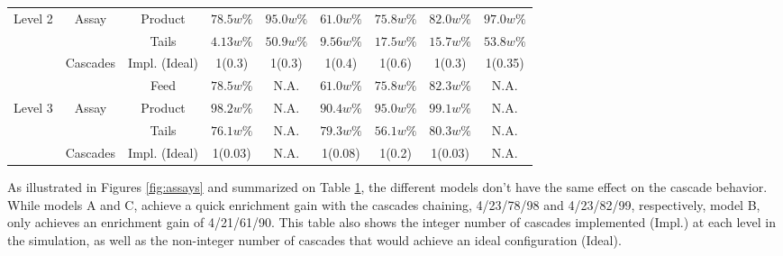 \begin{table}[h!]
\begin{tabular*}{\textwidth}{c @{\extracolsep{\fill}} cccccccc}
Level 2 & Assay      & Product    & $78.5w\%$ & $95.0w\%$ & $61.0w\%$ & $75.8w\%$ & $82.0w\%$ & $97.0w\%$ \\
        &            & Tails      & $4.13w\%$ & $50.9w\%$ & $9.56w\%$ & $17.5w\%$ & $15.7w\%$ & $53.8w\%$ \\
        & Cascades   & Impl. (Ideal)& 1(0.3)    & 1(0.3)    & 1(0.4)    & 1(0.6)    & 1(0.3)    & 1(0.35)   \\
\midrule                                                                                                 
        &            & Feed       & $78.5w\%$ & N.A.      & $61.0w\%$ & $75.8w\%$ & $82.3w\%$ & N.A.      \\
Level 3 & Assay      & Product    & $98.2w\%$ & N.A.      & $90.4w\%$ & $95.0w\%$ & $99.1w\%$ & N.A.      \\
        &            & Tails      & $76.1w\%$ & N.A.      & $79.3w\%$ & $56.1w\%$ & $80.3w\%$ & N.A.      \\
        & Cascades   & Impl. (Ideal)& 1(0.03)   & N.A.      & 1(0.08)   & 1(0.2)    & 1(0.03)   & N.A.      \\
\bottomrule
\end{tabular*}
  \label{tab:level}
\end{table}

As illustrated in Figures \ref{fig:assays} and summarized on Table
\ref{tab:level}, the different models don't have the same effect on the
cascade behavior. While models A and C, achieve a quick enrichment gain with
the cascades chaining, 4/23/78/98 and 4/23/82/99, respectively, model B, only
achieves an enrichment gain of 4/21/61/90.  This table also shows the integer
number of cascades implemented (Impl.) at each level in the simulation, as well as the
non-integer number of cascades that would achieve an ideal configuration (Ideal).



